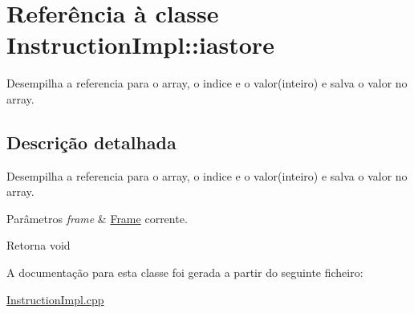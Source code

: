 \hypertarget{class_instruction_impl_1_1iastore}{}\section{Referência à classe Instruction\+Impl\+:\+:iastore}
\label{class_instruction_impl_1_1iastore}


Desempilha a referencia para o array, o indice e o valor(inteiro) e salva o valor no array.  




\subsection{Descrição detalhada}
Desempilha a referencia para o array, o indice e o valor(inteiro) e salva o valor no array. 


\begin{DoxyParams}{Parâmetros}
{\em frame} & \hyperlink{struct_frame}{Frame} corrente. \\
\hline
\end{DoxyParams}
\begin{DoxyReturn}{Retorna}
void 
\end{DoxyReturn}


A documentação para esta classe foi gerada a partir do seguinte ficheiro\+:\begin{DoxyCompactItemize}
\item 
\hyperlink{_instruction_impl_8cpp}{Instruction\+Impl.\+cpp}\end{DoxyCompactItemize}
